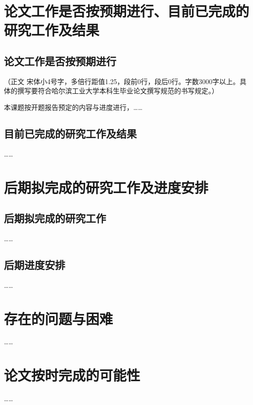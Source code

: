 
\section{论文工作是否按预期进行、目前已完成的研究工作及结果}

\subsection{论文工作是否按预期进行}

（正文  宋体小4号字，多倍行距值1.25，段前0行，段后0行。字数3000字以上。具体的撰写要符合哈尔滨工业大学本科生毕业论文撰写规范的书写规定。）

本课题按开题报告预定的内容与进度进行，……

\subsection{目前已完成的研究工作及结果}

……\cite{kanamori1998}

\section{后期拟完成的研究工作及进度安排}

\subsection{后期拟完成的研究工作}

……

\subsection{后期进度安排}

……

\section{存在的问题与困难}

……

\section{论文按时完成的可能性}

……
